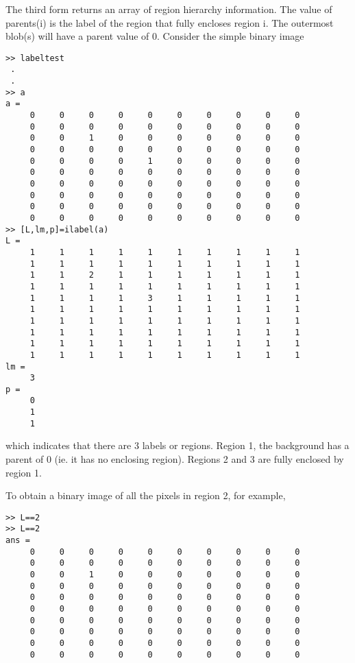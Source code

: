 \documentclass{article}
\newcommand{\mex}[1]{\hskip -1.25in 
{\hbox{\makebox[1.25in][l]{\Refon Examples}}}{#1}\vskip 0.25in}
\newcommand{\var}[1]{{\vtt #1}}
\begin{document}
{{{{The third form returns an array of region hierarchy information.
The value of \var{parents(i)} is the label of the region that fully
encloses region \var{i}.  The outermost blob(s) will have a parent
value of 0.
}
\mex{Consider the simple binary image}
\begin{verbatim}
>> labeltest
 .
 .
>> a
a =
     0     0     0     0     0     0     0     0     0     0
     0     0     0     0     0     0     0     0     0     0
     0     0     1     0     0     0     0     0     0     0
     0     0     0     0     0     0     0     0     0     0
     0     0     0     0     1     0     0     0     0     0
     0     0     0     0     0     0     0     0     0     0
     0     0     0     0     0     0     0     0     0     0
     0     0     0     0     0     0     0     0     0     0
     0     0     0     0     0     0     0     0     0     0
     0     0     0     0     0     0     0     0     0     0
>> [L,lm,p]=ilabel(a)
L =
     1     1     1     1     1     1     1     1     1     1
     1     1     1     1     1     1     1     1     1     1
     1     1     2     1     1     1     1     1     1     1
     1     1     1     1     1     1     1     1     1     1
     1     1     1     1     3     1     1     1     1     1
     1     1     1     1     1     1     1     1     1     1
     1     1     1     1     1     1     1     1     1     1
     1     1     1     1     1     1     1     1     1     1
     1     1     1     1     1     1     1     1     1     1
     1     1     1     1     1     1     1     1     1     1
lm =
     3
p =
     0
     1
     1
\end{verbatim}
\noindent
which indicates that there are 3 labels or regions.  Region 1, the background
has a parent of 0 (ie. it has no enclosing region).  Regions 2 and 3
are fully enclosed by region 1.

To obtain a binary image of all the pixels in region 2, for example,
\begin{verbatim}
>> L==2
>> L==2
ans =
     0     0     0     0     0     0     0     0     0     0
     0     0     0     0     0     0     0     0     0     0
     0     0     1     0     0     0     0     0     0     0
     0     0     0     0     0     0     0     0     0     0
     0     0     0     0     0     0     0     0     0     0
     0     0     0     0     0     0     0     0     0     0
     0     0     0     0     0     0     0     0     0     0
     0     0     0     0     0     0     0     0     0     0
     0     0     0     0     0     0     0     0     0     0
     0     0     0     0     0     0     0     0     0     0
\end{verbatim}

}}}
\end{document}
